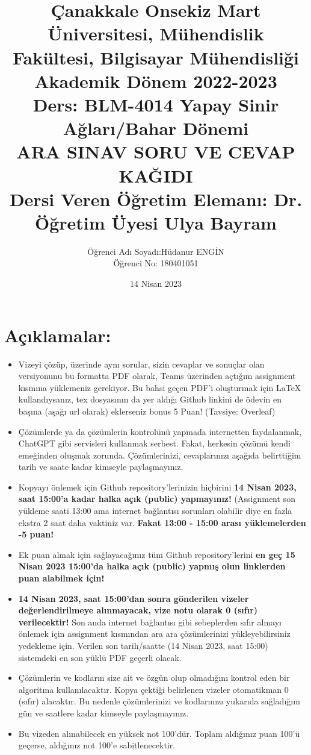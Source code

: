\documentclass[11pt]{article}
\title{Çanakkale Onsekiz Mart Üniversitesi, Mühendislik Fakültesi, Bilgisayar Mühendisliği Akademik Dönem 2022-2023\\
Ders: BLM-4014 Yapay Sinir Ağları/Bahar Dönemi\\ 
ARA SINAV SORU VE CEVAP KAĞIDI\\
Dersi Veren Öğretim Elemanı: Dr. Öğretim Üyesi Ulya Bayram}
\author{%
\begin{minipage}{\textwidth}
\raggedright
Öğrenci Adı Soyadı:Hüdanur ENGİN\\ %
Öğrenci No: 180401051
\end{minipage}%
}
\date{14 Nisan 2023}
\begin{document}
\maketitle

\vspace{-.5in}
\section*{Açıklamalar:}
\begin{itemize}
    \item Vizeyi çözüp, üzerinde aynı sorular, sizin cevaplar ve sonuçlar olan versiyonunu bu formatta PDF olarak, Teams üzerinden açtığım assignment kısmına yüklemeniz gerekiyor. Bu bahsi geçen PDF'i oluşturmak için LaTeX kullandıysanız, tex dosyasının da yer aldığı Github linkini de ödevin en başına (aşağı url olarak) eklerseniz bonus 5 Puan! (Tavsiye: Overleaf)
    \item Çözümlerde ya da çözümlerin kontrolünü yapmada internetten faydalanmak, ChatGPT gibi servisleri kullanmak serbest. Fakat, herkesin çözümü kendi emeğinden oluşmak zorunda. Çözümlerinizi, cevaplarınızı aşağıda belirttiğim tarih ve saate kadar kimseyle paylaşmayınız. 
    \item Kopyayı önlemek için Github repository'lerinizin hiçbirini \textbf{14 Nisan 2023, saat 15:00'a kadar halka açık (public) yapmayınız!} (Assignment son yükleme saati 13:00 ama internet bağlantısı sorunları olabilir diye en fazla ekstra 2 saat daha vaktiniz var. \textbf{Fakat 13:00 - 15:00 arası yüklemelerden -5 puan!}
    \item Ek puan almak için sağlayacağınız tüm Github repository'lerini \textbf{en geç 15 Nisan 2023 15:00'da halka açık (public) yapmış olun linklerden puan alabilmek için!}
    \item \textbf{14 Nisan 2023, saat 15:00'dan sonra gönderilen vizeler değerlendirilmeye alınmayacak, vize notu olarak 0 (sıfır) verilecektir!} Son anda internet bağlantısı gibi sebeplerden sıfır almayı önlemek için assignment kısmından ara ara çözümlerinizi yükleyebilirsiniz yedekleme için. Verilen son tarih/saatte (14 Nisan 2023, saat 15:00) sistemdeki en son yüklü PDF geçerli olacak.
    \item Çözümlerin ve kodların size ait ve özgün olup olmadığını kontrol eden bir algoritma kullanılacaktır. Kopya çektiği belirlenen vizeler otomatikman 0 (sıfır) alacaktır. Bu nedenle çözümlerinizi ve kodlarınızı yukarıda sağladığım gün ve saatlere kadar kimseyle paylaşmayınız.
    \item Bu vizeden alınabilecek en yüksek not 100'dür. Toplam aldığınız puan 100'ü geçerse, aldığınız not 100'e sabitlenecektir.

\end{itemize}
\end{document}
